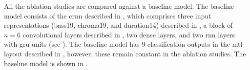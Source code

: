 
All the ablation studies are compared against a baseline
model. The baseline model consists of the \gls{crnn}
described in , which comprises three
input representations (\gls{bass19}, \gls{chroma19}, and
\gls{duration14}) described in ,
a block of $n=6$ convolutional layers described in
, two dense layers, and two
\gls{rnn} layers with \gls{gru} units (see
). The baseline model has 9
classification outputs in the \gls{mtl} layout described in
, however, these remain
constant in the ablation studies. The baseline model is
shown in .


